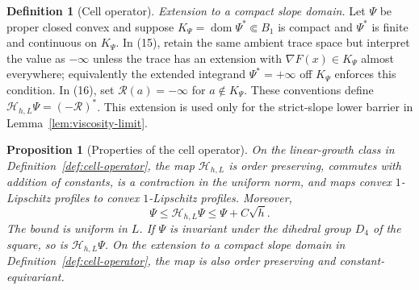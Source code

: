 \documentclass{aomart}
\newtheorem{proposition}[theorem]{Proposition}
\theoremstyle{definition}
\newtheorem{definition}[theorem]{Definition}
\newcommand{\1}{\mathbf 1}
\begin{document}
\begin{definition}[Cell operator]
\smallskip\noindent\emph{Extension to a compact slope domain.} Let
$\Psi$ be proper closed convex and suppose
$K_ \Psi=\operatorname {dom}\Psi^*\Subset B_ 1$ is compact and
$\Psi^*$ is finite and continuous on $K_ \Psi$.  In (15), retain the
same ambient trace space but interpret the value as $-\infty$ unless
the trace has an extension with
$\nabla F(x)\in K_ \Psi$ almost everywhere; equivalently the extended
integrand $\Psi^*=+\infty$ off $K_ \Psi$ enforces this condition.
In (16), set $\mathcal R(a)=-\infty$ for $a\notin K_ \Psi$.  These conventions
define $\mathcal H_ {h,L}\Psi=(-\mathcal R)^*$.  This extension is used only for the strict-slope lower barrier in
Lemma~\ref{lem:viscosity-limit}.

\end{definition}

\begin{proposition}[Properties of the cell operator]\label{prop:cell-operator-properties}
On the linear-growth class in Definition~\ref{def:cell-operator}, the map $\mathcal H_ {h,L}$ is order preserving,
commutes with addition of constants, is a contraction in the uniform
norm, and maps convex $1$-Lipschitz profiles to convex
$1$-Lipschitz profiles.  Moreover,
\begin{equation}
\Psi\leq\mathcal H_ {h,L}\Psi\leq\Psi+C\sqrt h.
\tag{16a}
\end{equation}
The bound is uniform in $L$.  If $\Psi$ is invariant under the dihedral group
$D_ 4$ of the square, so is $\mathcal H_ {h,L}\Psi$.
On the extension to a compact slope domain in Definition~\ref{def:cell-operator},
the map is also order preserving and constant-equivariant.
\end{proposition}
\end{document}

